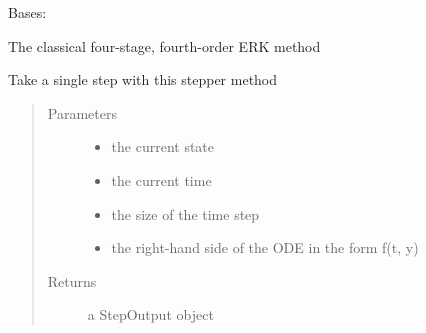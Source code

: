 \documentclass[letterpaper,10pt,english]{sphinxmanual}
\begin{document}

\begin{fulllineitems}
\label{\detokenize{spitfire.time.methods:spitfire.time.methods.ExplicitRungeKutta4Classical}}
Bases: {\hyperref[\detokenize{spitfire.time.methods:spitfire.time.methods.ExplicitRungeKutta}]{}}

The classical four-stage, fourth-order ERK method

\begin{fulllineitems}
\label{\detokenize{spitfire.time.methods:spitfire.time.methods.ExplicitRungeKutta4Classical.single_step}}
Take a single step with this stepper method
\begin{quote}\begin{description}
\item[{Parameters}] \leavevmode\begin{itemize}
\item {} 
 \textendash{} the current state

\item {} 
 \textendash{} the current time

\item {} 
 \textendash{} the size of the time step

\item {} 
 \textendash{} the right-hand side of the ODE in the form f(t, y)

\end{itemize}

\item[{Returns}] \leavevmode
a StepOutput object

\end{description}\end{quote}

\end{fulllineitems}


\end{fulllineitems}
\end{document}

